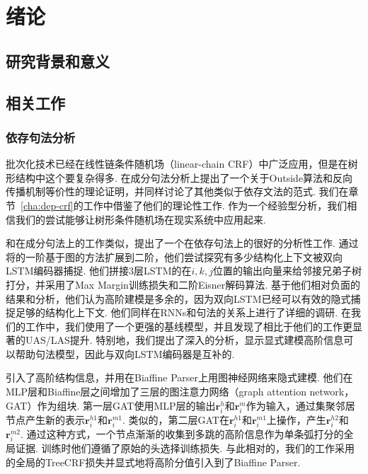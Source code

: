 \chapter{绪论}
\label{cha:intro}

\section{研究背景和意义}

\section{相关工作}
\label{sec:relworks}

\subsection{依存句法分析}

批次化技术已经在线性链条件随机场（linear-chain CRF）中广泛应用，但是在树形结构中这个要复杂得多.
\citet{eisner-2016-inside}在成分句法分析上提出了一个关于Outside算法和反向传播机制等价性的理论证明，并同样讨论了其他类似于依存文法的范式.
我们在章节~\ref{cha:dep-crf}的工作中借鉴了他们的理论性工作.
作为一个经验型分析，我们相信我们的尝试能够让树形条件随机场在现实系统中应用起来.

和\citet{gaddy-etal-2018-whats}在成分句法上的工作类似，\citet{falenska-kuhn-2019-non}提出了一个在依存句法上的很好的分析性工作.
通过将\citet{kiperwasser-goldberg-2016-simple}的一阶基于图的方法扩展到二阶，他们尝试探究有多少结构化上下文被双向LSTM编码器捕捉.
他们拼接3层LSTM的在$i,k,j$位置的输出向量来给邻接兄弟子树打分，并采用了Max Margin训练损失和二阶Eisner解码算法\citep{mcdonald-pereira-2006-online}.
基于他们相对负面的结果和分析，他们认为高阶建模是多余的，因为双向LSTM已经可以有效的隐式捕捉足够的结构化上下文.
他们同样在RNNs和句法的关系上进行了详细的调研.
在我们的工作中，我们使用了一个更强的基线模型，并且发现了相比于他们的工作更显著的UAS/LAS提升.
特别地，我们提出了深入的分析，显示显式建模高阶信息可以帮助句法模型，因此与双向LSTM编码器是互补的.


\citet{ji-etal-2019-graph}引入了高阶结构信息，并用在Biaffine Parser\citep{dozat-etal-2017-biaffine}上用图神经网络来隐式建模.
他们在MLP层和Biaffine层之间增加了三层的图注意力网络（graph attention network，GAT）\citep{velickovic-etal-2018-graph}作为组块.
第一层GAT使用MLP层的输出$\mathbf{r}_i^{h}$和$\mathbf{r}_i^{m}$作为输入，通过集聚邻居节点产生新的表示$\mathbf{r}_i^{h1}$和$\mathbf{r}_i^{m1}$.
类似的，第二层GAT在$\mathbf{r}_i^{h1}$和$\mathbf{r}_i^{m1}$上操作，产生$\mathbf{r}_i^{h2}$和$\mathbf{r}_i^{m2}$.
通过这种方式，一个节点渐渐的收集到多跳的高阶信息作为单条弧打分的全局证据.
训练时他们遵循了原始的头选择训练损失.
与此相对的，我们的工作采用的全局的TreeCRF损失并显式地将高阶分值引入到了Biaffine Parser.

